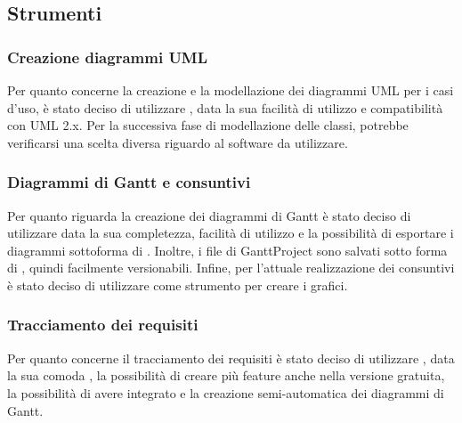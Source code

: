 \subsection{Strumenti}
\subsubsection{Creazione diagrammi UML}
Per quanto concerne la creazione e la modellazione dei diagrammi UML per i casi d'uso, è stato deciso di utilizzare , data la sua facilità di utilizzo e compatibilità con UML 2.x. Per la successiva fase di modellazione delle classi, potrebbe verificarsi una scelta diversa riguardo al software da utilizzare.
\subsubsection{Diagrammi di Gantt e consuntivi}
Per quanto riguarda la creazione dei diagrammi di Gantt è stato deciso di utilizzare  data la sua completezza, facilità di utilizzo e la possibilità di esportare i diagrammi sottoforma di . Inoltre, i file  di GanttProject sono salvati sotto forma di , quindi facilmente versionabili.
Infine, per l'attuale realizzazione dei consuntivi è stato deciso di utilizzare  come strumento per creare i grafici.
\subsubsection{Tracciamento dei requisiti}
Per quanto concerne il tracciamento dei requisiti è stato deciso di utilizzare , data la sua comoda , la possibilità di creare più feature anche nella versione gratuita, la possibilità di avere  integrato e la creazione semi-automatica dei diagrammi di Gantt.
\pagebreak
